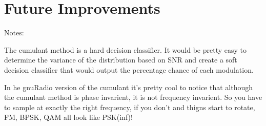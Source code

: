 \chapter{Future Improvements}

Notes:

The cumulant method is a hard decision classifier.  It would be pretty easy to
determine the variance of the distribution based on SNR and create a soft
decision classifier that would output the percentage chance of each modulation.

In he gnuRadio version of the cumulant it's pretty cool to notice that although
the cumulant method is phase invarient, it is not frequency invarient.  So you
have to sample at exactly the right frequency, if you don't and thigns start to
rotate, FM, BPSK, QAM all look like PSK(inf)!
